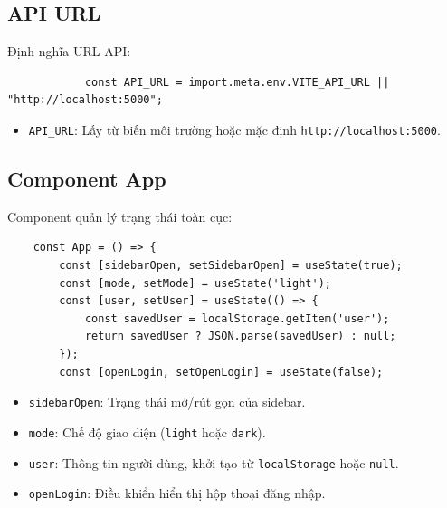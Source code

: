         \subsection{API URL}
            \hspace*{0.6cm}Định nghĩa URL API:
            \begin{lstlisting}
            const API_URL = import.meta.env.VITE_API_URL || "http://localhost:5000";
            \end{lstlisting}
            \begin{itemize}
                \item \texttt{API\_URL}: Lấy từ biến môi trường hoặc mặc định \texttt{http://localhost:5000}.
            \end{itemize}

        \subsection{Component App}
            \hspace*{0.6cm}Component quản lý trạng thái toàn cục:
            \begin{lstlisting}
    const App = () => {
        const [sidebarOpen, setSidebarOpen] = useState(true);
        const [mode, setMode] = useState('light');
        const [user, setUser] = useState(() => {
            const savedUser = localStorage.getItem('user');
            return savedUser ? JSON.parse(savedUser) : null;
        });
        const [openLogin, setOpenLogin] = useState(false);
            \end{lstlisting}
            \begin{itemize}
                \item \texttt{sidebarOpen}: Trạng thái mở/rút gọn của sidebar.
                \item \texttt{mode}: Chế độ giao diện (\texttt{light} hoặc \texttt{dark}).
                \item \texttt{user}: Thông tin người dùng, khởi tạo từ \texttt{localStorage} hoặc \texttt{null}.
                \item \texttt{openLogin}: Điều khiển hiển thị hộp thoại đăng nhập.
            \end{itemize}


